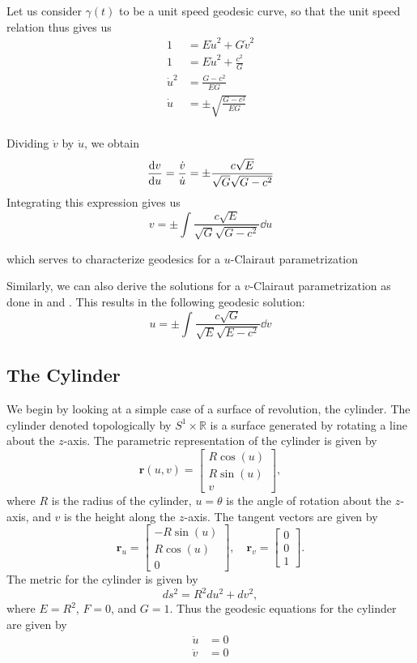 \documentclass[12pt]{article}
\begin{document}
Let us consider $\gamma(t)$ to be a unit speed geodesic curve, so that the unit speed relation thus gives us
\begin{align*}
    1 &= E \dot{u}^2 + G \dot{v}^2 \\
    1 &= E \dot{u}^2 + \frac{c^2}{G} \\
    \dot{u}^2 &= \frac{G - c^2}{EG} \\
    \dot{u} &= \pm \sqrt{\frac{G - c^2}{EG}} \\
\end{align*}

Dividing $\dot{v}$ by $\dot{u}$, we obtain
\[
    \dv{v}{u} = \frac{\dot{v}}{\dot{u}} = \pm \frac{c\sqrt{E}}{\sqrt{G}\sqrt{G - c^{2}}} 
\]
Integrating this expression gives us
\begin{equation} \label{eq:v_Clairaut_integral}
    v = \pm \int \frac{c\sqrt{E}}{\sqrt{G}\sqrt{G - c^{2}}} \dd{u}
\end{equation}

which serves to characterize geodesics for a $u$-Clairaut parametrization

Similarly, we can also derive the solutions for a $v$-Clairaut parametrization as done in \cite{oprea2007differential} and \cite{rigatti2023characterizing}.
This results in the following geodesic solution:
\begin{equation} \label{eq:u_Clairaut_integral}
	u = \pm \int \frac{c\sqrt{G}}{\sqrt{E}\sqrt{E - c^{2}}} \dd{v}
\end{equation}

\subsection{The Cylinder}
We begin by looking at a simple case of a surface of revolution, the cylinder.
The cylinder denoted topologically by \(S^1 \times \mathbb{R}\) is a surface generated by rotating a line about the \(z\)-axis.
The parametric representation of the cylinder is given by
\[
	\mathbf{r}(u, v) = \begin{bmatrix} R \cos (u) \\ R \sin (u) \\ v \end{bmatrix},
\]
where \(R\) is the radius of the cylinder, \(u = \theta\) is the angle of rotation about the \(z\)-axis, and \(v\) is the height along the \(z\)-axis.
The tangent vectors are given by
\[
	\mathbf{r}_u = \begin{bmatrix} -R \sin (u) \\ R \cos (u) \\ 0 \end{bmatrix}, \quad \mathbf{r}_v = \begin{bmatrix} 0 \\ 0 \\ 1 \end{bmatrix}.
\]
The metric for the cylinder is given by
\[
	ds^2 = R^2 du^2 + dv^2,
\]
where \(E = R^2\), \(F = 0\), and \(G = 1\).
Thus the geodesic equations for the cylinder are given by
\begin{align*}
	\ddot{u} &= 0 \\
	\ddot{v} &= 0
\end{align*}
\end{document}
